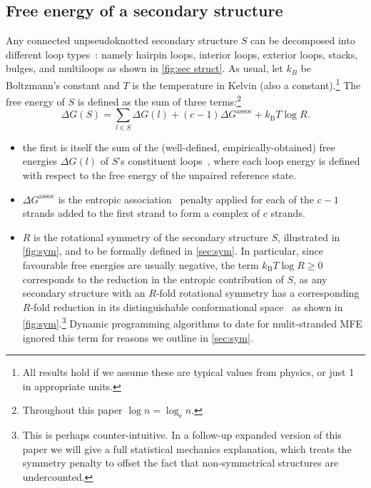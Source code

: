 \subsection{Free energy of a secondary structure}
Any connected unpseudoknotted secondary structure $S$ can be decomposed into different loop types~\cite{tinoco,santa,mathews1999expanded}: namely hairpin loops, interior loops, exterior loops, stacks, bulges, and multiloops as shown in \cref{fig:sec struct}. 
As usual, let  $k_B$ be Boltzmann's constant and $T$ is the temperature in Kelvin (also a constant).\footnote{All results hold if we assume these are typical values from physics, or just 1 in appropriate units.} 
The free energy of $S$ is defined as the sum of three terms:\footnote{Throughout this paper $\log n = \log_\mathrm{e} n$.}
\begin{equation}\label{eq:DGss}
	\Delta G(S) =  \sum_{l\in S} \Delta G(l) + (c-1)\Delta G^{\textrm{assoc}} + k_\mathrm{B} T \log R.
\end{equation}  
\begin{itemize}
	\item the first is itself the sum of the (well-defined, empirically-obtained) free energies $\Delta G(l)$ of $S$'s constituent loops~\cite{dirks2007thermodynamic}, where each loop energy is defined with respect to the free energy of the unpaired reference state.
	\item $\Delta G^{\textrm{assoc}} $ is the entropic association~\cite{dirks2007thermodynamic} penalty applied for each of the $c-1$ strands added to the first strand to form a complex of $c$ strands.
	\item $R$ is the rotational symmetry of the secondary structure $S$,  illustrated in \cref{fig:sym}, and to be formally defined  in \cref{sec:sym}.  In particular, since favourable free energies are usually negative, the term  $k_\mathrm{B} T \log R \geq 0$ corresponds to the reduction in the entropic contribution of $S$, as any secondary structure with an $R$-fold rotational symmetry has a corresponding $R$-fold reduction in its distinguishable conformational space~\cite{dirks2007thermodynamic} as shown in \cref{fig:sym}.\footnote{This is perhaps counter-intuitive. In a follow-up expanded version of this paper we will give a full statistical mechanics explanation, which treats the symmetry penalty to offset the fact that non-symmetrical structures are undercounted.} Dynamic programming algorithms to date for mulit-stranded MFE ignored this term for reasons we outline in \cref{sec:sym}.
\end{itemize}



